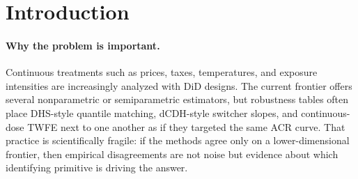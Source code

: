 \documentclass[11pt]{article}
\theoremstyle{definition}
\theoremstyle{plain}
\theoremstyle{remark}
\begin{document}
\begin{abstract}
Continuous-treatment difference-in-differences now has several plausible ACR estimators, but their identifying functionals are built from different primitives: quantile matching, switcher-stayer local slopes, and residualized linear projection. This proposal asks for the sharp frontier at which the DHS, dCDH, and TWFE population functionals coincide for the same cohort-period weighted ACR curve \(\mathrm{ACR}_\omega(d)\), and where they separate. The flagship kernel is a conjectural two-level spectral theorem: realized-law functional equality at an interior dose is governed by the active realized residual vector \(K^{func}_{h,\omega}(d)\bar A_{h,\omega}(d)=K^{raw}_{h,\omega}(d)\bar A^{obs}_{h,\omega}(d)\), while uniform equality over all admissible local perturbations is governed by the stronger operator condition \(\kappa^{func}_{h,\omega}(d)=0\). A separate common-submodel variance conjecture uses \(K^{score}_{h,\omega}(d)\) plus explicit baseline residual formulas to ask when the three scores also share the same efficiency bound. If resolved, the result would give applied researchers a diagnostic object to report before treating these continuous-dose DiD estimators as robustness checks for the same estimand.
\end{abstract}

\section{Introduction}
\paragraph{Why the problem is important.}
Continuous treatments such as prices, taxes, temperatures, and exposure intensities are increasingly analyzed with DiD designs. The current frontier offers several nonparametric or semiparametric estimators, but robustness tables often place DHS-style quantile matching, dCDH-style switcher slopes, and continuous-dose TWFE next to one another as if they targeted the same ACR curve. That practice is scientifically fragile: if the methods agree only on a lower-dimensional frontier, then empirical disagreements are not noise but evidence about which identifying primitive is driving the answer.
\end{document}
